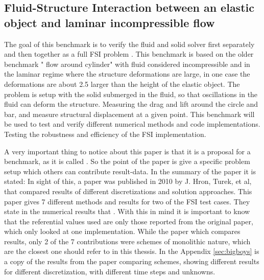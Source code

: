 \subsection{Fluid-Structure Interaction between an elastic object and laminar incompressible flow} \label{sec:HronTurek}
The goal of this benchmark is to verify the fluid and solid solver first separately and then together as a full FSI problem \cite{Hron2006a}. This benchmark is based on the older benchmark " flow around cylinder" with fluid considered incompressible and in the laminar regime where the structure deformations are large, in one case the deformations are about 2.5 larger than the height of the elastic object. The problem is setup with the solid submerged in the fluid, so that oscillations in the fluid can deform the structure. Measuring the drag and lift around the circle and bar, and measure structural displacement at a given point. This benchmark will be used to test and verify different numerical methods and code implementations. Testing the robustness and efficiency of the FSI implementation.\newline

 A very important thing to notice about this paper \cite{Hron2006a} is that it is a proposal for a benchmark, as it is called . So the point of the paper is give a specific problem setup which others can contribute result-data. In the summary of the paper it is stated:  In sight of this, a paper was published in 2010 by J. Hron, Turek, et al, \cite{Turek2010} that compared results of different discretizations and solution approaches. This paper \cite{Turek2010} gives 7 different methods and results for two of the FSI test cases. They state in the numerical results that . With this in mind it is important to know that the referential values used are only those reported from the original paper, which only looked at one implementation. While the paper which compares results, only 2 of the 7 contributions were schemes of monolithic nature, which are the closest one should refer to in this thessis.  In the Appendix \ref{sec:bigboys} is a copy of the results from the paper comparing schemes, showing different results for different discretization, with different time steps and unknowns. 


